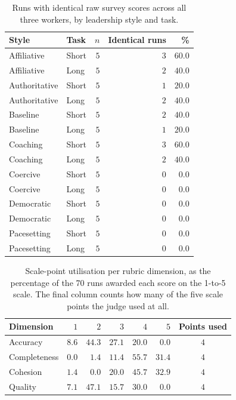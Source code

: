 \begin{table}[htbp]
  \centering
  \small
  \caption{Runs with identical raw survey scores across all three workers, by leadership style and task.}
  \label{tab:02-identical-raw-scores}
\begin{tabular}{llrrr}
    \toprule
    Style & Task & $n$ & Identical runs & \% \\
    \midrule
    Affiliative & Short & $5$ & $3$ & $60.0$ \\
    Affiliative & Long & $5$ & $2$ & $40.0$ \\
    Authoritative & Short & $5$ & $1$ & $20.0$ \\
    Authoritative & Long & $5$ & $2$ & $40.0$ \\
    Baseline & Short & $5$ & $2$ & $40.0$ \\
    Baseline & Long & $5$ & $1$ & $20.0$ \\
    Coaching & Short & $5$ & $3$ & $60.0$ \\
    Coaching & Long & $5$ & $2$ & $40.0$ \\
    Coercive & Short & $5$ & $0$ & $0.0$ \\
    Coercive & Long & $5$ & $0$ & $0.0$ \\
    Democratic & Short & $5$ & $0$ & $0.0$ \\
    Democratic & Long & $5$ & $0$ & $0.0$ \\
    Pacesetting & Short & $5$ & $0$ & $0.0$ \\
    Pacesetting & Long & $5$ & $0$ & $0.0$ \\
    \bottomrule
\end{tabular}%
\end{table}

\begin{table}[htbp]
  \centering
  \small
  \caption{Scale-point utilisation per rubric dimension, as the percentage of the 70 runs awarded each score on the 1-to-5 scale. The final column counts how many of the five scale points the judge used at all.}
  \label{tab:02-judge-scale-usage}
\begin{tabular}{lrrrrrc}
    \toprule
    Dimension & $1$ & $2$ & $3$ & $4$ & $5$ & Points used \\
    \midrule
    Accuracy & $8.6$ & $44.3$ & $27.1$ & $20.0$ & $0.0$ & $4$ \\
    Completeness & $0.0$ & $1.4$ & $11.4$ & $55.7$ & $31.4$ & $4$ \\
    Cohesion & $1.4$ & $0.0$ & $20.0$ & $45.7$ & $32.9$ & $4$ \\
    Quality & $7.1$ & $47.1$ & $15.7$ & $30.0$ & $0.0$ & $4$ \\
    \bottomrule
\end{tabular}%
\end{table}

